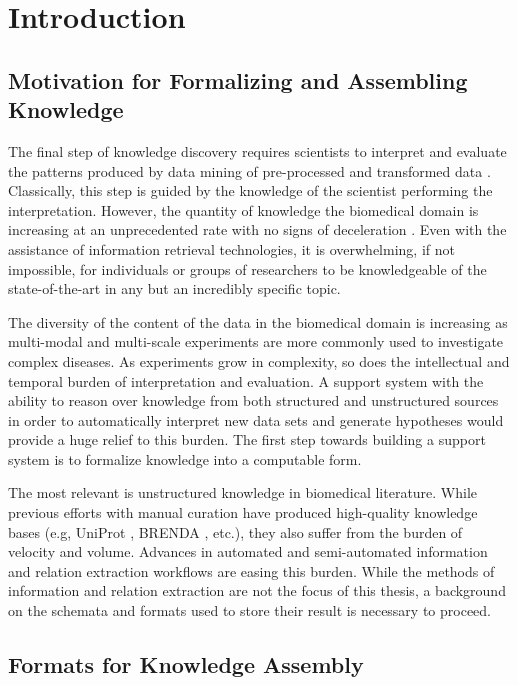 \chapter{Introduction}
\label{ch:intro}

\section{Motivation for Formalizing and Assembling Knowledge}
\label{ka_motivation}

The final step of knowledge discovery requires scientists to interpret and evaluate the patterns produced by data mining of pre-processed and transformed data \cite{Fayyad1996}. Classically, this step is guided by the knowledge of the scientist performing the interpretation. However, the quantity of knowledge the biomedical domain is increasing at an unprecedented rate with no signs of deceleration \cite{Bellazzi2014}. Even with the assistance of information retrieval technologies, it is overwhelming, if not impossible, for individuals or groups of researchers to be knowledgeable of the state-of-the-art in any but an incredibly specific topic.

The diversity of the content of the data in the biomedical domain is increasing as multi-modal and multi-scale experiments are more commonly used to investigate complex diseases. As experiments grow in complexity, so does the intellectual and temporal burden of interpretation and evaluation. A support system with the ability to reason over knowledge from both structured and unstructured sources in order to automatically interpret new data sets and generate hypotheses would provide a huge relief to this burden. The first step towards building a support system is to formalize knowledge into a computable form.

The most relevant is unstructured knowledge in biomedical literature. While previous efforts with manual curation have produced high-quality knowledge bases (e.g, \ac{UniProt} \cite{Bateman2017}, \ac{BRENDA} \cite{Placzek2017}, etc.), they also suffer from the burden of velocity and volume. Advances in automated and semi-automated information and relation extraction workflows are easing this burden. While the methods of information and relation extraction are not the focus of this thesis, a background on the schemata and formats used to store their result is necessary to proceed.

\section{Formats for Knowledge Assembly}
\label{ka_formats}

